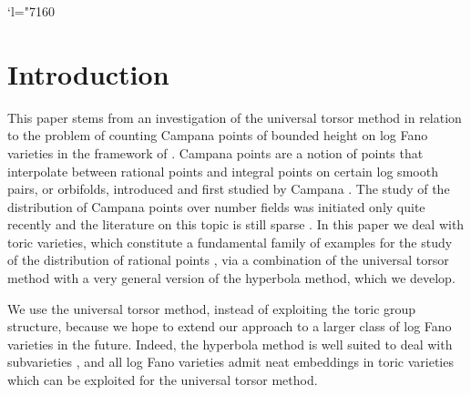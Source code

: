 \documentclass[JEP,XML,SOM,Unicode,published]{cedram}
\newcommand{\Changel}{\mathcode`l="7160}
\theoremstyle{definition}
\numberwithin{theorem}{section}
\begin{document}
\maketitle
\vspace*{-\baselineskip}
\tableofcontents
\mainmatter
\Changel

\section{Introduction}

This paper stems from an investigation of the universal torsor method \cite{MR1679841, MR3552013} in relation to the problem of counting Campana points of bounded height on log Fano varieties in the framework of \cite[Conj.\,1.1]{PSTVA}.
Campana points are a notion of points that interpolate between rational points and integral points on certain log smooth pairs, or orbifolds, introduced and first studied by Campana \cite{MR2097416, MR2831280, MR3477539}. The study of the distribution of Campana points over number fields was initiated only quite recently and the literature on this topic is still sparse \cite{MR2931315, MR2968632, BY, Shute2, PSTVA, Shute, Streeter, Xiao, BBKOPWproc}.
In this paper we deal with toric varieties, which constitute a fundamental family of examples for the study of the distribution of rational points \cite{MR1353919, MR1369408, MR1423638, MR1620682, MR1679841, Bre01b}, via a combination of the universal torsor method with a very general version of the hyperbola method, which we develop.

We use the universal torsor method, instead of exploiting the toric group structure, because we hope to extend our approach to a larger class of log Fano varieties in the future. Indeed,
the hyperbola method is well suited to deal with subvarieties \cite{MR3320489, Sch, MR3731304, BB, mignot1, Mignot, mignot2, BroHu}, and all log Fano varieties admit neat embeddings in toric varieties \cite{MR3307753, MR3275656} which can be exploited for the universal torsor method.\par
\end{document}
